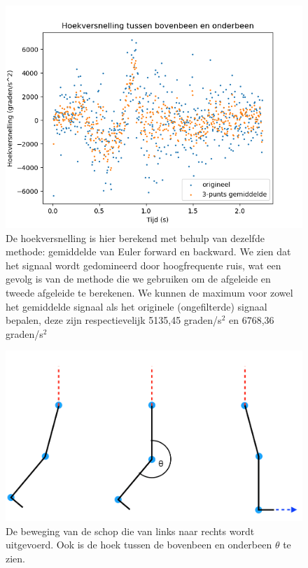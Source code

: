 \documentclass{article}
\begin{document}
\begin{figure}[h]
    \centering
    \includegraphics[width=\textwidth]{figures/hoekversnelling.png}
    \caption{De hoekversnelling is hier berekend met behulp van dezelfde methode: gemiddelde van Euler forward en backward. We zien dat het signaal wordt gedomineerd door hoogfrequente ruis, wat een gevolg is van de methode die we gebruiken om de afgeleide en tweede afgeleide te berekenen. We kunnen de maximum voor zowel het gemiddelde signaal als het originele (ongefilterde) signaal bepalen, deze zijn respectievelijk 5135,45 graden/s$^2$ en 6768,36 graden/s$^2$}
    \label{fig:hoekversnelling}
\end{figure}

\begin{figure}[h]
    \centering
    \includegraphics[width=\textwidth]{figures/schop.png}
    \caption{De beweging van de schop die van links naar rechts wordt uitgevoerd. Ook is de hoek tussen de bovenbeen en onderbeen $\theta$ te zien.}
    \label{fig:schop}
\end{figure}
\end{document}
